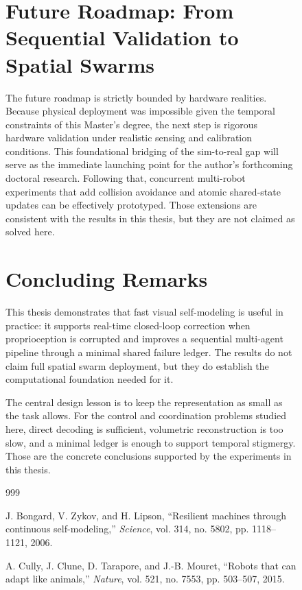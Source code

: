 \documentclass[12pt,a4paper,oneside]{report}
\begin{document}
\begin{figure}[H]
\section{Future Roadmap: From Sequential Validation to Spatial Swarms}

The future roadmap is strictly bounded by hardware realities. Because physical deployment was impossible given the temporal constraints of this Master's degree, the next step is rigorous hardware validation under realistic sensing and calibration conditions. This foundational bridging of the sim-to-real gap will serve as the immediate launching point for the author's forthcoming doctoral research. Following that, concurrent multi-robot experiments that add collision avoidance and atomic shared-state updates can be effectively prototyped. Those extensions are consistent with the results in this thesis, but they are not claimed as solved here.

\section{Concluding Remarks}

This thesis demonstrates that fast visual self-modeling is useful in practice: it supports real-time closed-loop correction when proprioception is corrupted and improves a sequential multi-agent pipeline through a minimal shared failure ledger. The results do not claim full spatial swarm deployment, but they do establish the computational foundation needed for it.

The central design lesson is to keep the representation as small as the task allows. For the control and coordination problems studied here, direct decoding is sufficient, volumetric reconstruction is too slow, and a minimal ledger is enough to support temporal stigmergy. Those are the concrete conclusions supported by the experiments in this thesis.
\clearpage

\begin{thebibliography}{999}


J. Bongard, V. Zykov, and H. Lipson, ``Resilient machines through continuous self-modeling,'' \textit{Science}, vol. 314, no. 5802, pp. 1118--1121, 2006.


A. Cully, J. Clune, D. Tarapore, and J.-B. Mouret, ``Robots that can adapt like animals,'' \textit{Nature}, vol. 521, no. 7553, pp. 503--507, 2015.


\end{thebibliography}
\end{figure}
\end{document}
